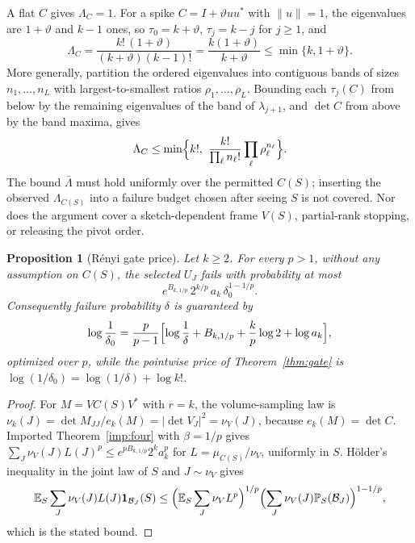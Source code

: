 \documentclass[11pt]{article}
\newtheorem{proposition}[theorem]{Proposition}
\theoremstyle{definition}\newtheorem{definition}[theorem]{Definition}
\theoremstyle{remark}\newtheorem{remark}[theorem]{Remark}
\newcommand{\E}{\mathbb E}
\newcommand{\Prob}{\mathbb P}
\newcommand{\1}{\mathbf 1}
\begin{document}
A flat $C$ gives $\Lambda_C=1$. For a spike $C=I+\vartheta uu^*$ with
$\|u\|=1$, the eigenvalues are $1+\vartheta$ and $k-1$ ones, so
$\tau_0=k+\vartheta$, $\tau_j=k-j$ for $j\ge1$, and
\[
 \Lambda_C=\frac{k!\,(1+\vartheta)}{(k+\vartheta)(k-1)!}
 =\frac{k(1+\vartheta)}{k+\vartheta}\le\min\{k,1+\vartheta\}.
\]
More generally, partition the ordered eigenvalues into contiguous bands
of sizes $n_1,\dots,n_L$ with largest-to-smallest ratios
$\rho_1,\dots,\rho_L$. Bounding each $\tau_j(C)$ from below by the
remaining eigenvalues of the band of $\lambda_{j+1}$, and $\det C$ from
above by the band maxima, gives
\begin{equation}\label{eq:bands}
 \Lambda_C\le\min\Bigl\{k!,\ \frac{k!}{\prod_\ell n_\ell!}\prod_\ell\rho_\ell^{n_\ell}\Bigr\}.
\end{equation}
The bound $\bar\Lambda$ must hold uniformly over the permitted $C(S)$;
inserting the observed $\Lambda_{C(S)}$ into a failure budget chosen after
seeing $S$ is not covered. Nor does the argument cover a
sketch-dependent frame $V(S)$, partial-rank stopping, or releasing the
pivot order.

\begin{proposition}[R\'enyi gate price]\label{prop:renyi-gate}
Let $k\ge2$. For every $p>1$, without any assumption on $C(S)$, the
selected $U_J$ fails with probability at most
\[
 e^{B_{k,1/p}}\,2^{k/p}\,a_k\,\delta_0^{1-1/p}.
\]
Consequently failure probability $\delta$ is guaranteed by
\begin{equation}\label{eq:renyi-delta0}
 \log\frac1{\delta_0}=\frac p{p-1}\Bigl[\log\frac1\delta+B_{k,1/p}
 +\frac kp\log2+\log a_k\Bigr],
\end{equation}
optimized over $p$, while the pointwise price of
Theorem~\ref{thm:gate} is $\log(1/\delta_0)=\log(1/\delta)+\log k!$.
\end{proposition}
\begin{proof}
For $M=VC(S)V^*$ with $r=k$, the volume-sampling law is
$\nu_k(J)=\det M_{JJ}/e_k(M)=|\det V_J|^2=\nu_V(J)$, because
$e_k(M)=\det C$. Imported Theorem~\ref{imp:four} with $\beta=1/p$ gives
$\sum_J\nu_V(J)L(J)^p\le e^{pB_{k,1/p}}2^ka_k^p$ for $L=\mu_{C(S)}/\nu_V$,
uniformly in $S$. H\"older's inequality in the joint law of $S$ and
$J\sim\nu_V$ gives
\[
 \E_S\sum_J\nu_V(J)L(J)\1_{\mathcal B_J}(S)
 \le\Bigl(\E_S\sum_J\nu_VL^p\Bigr)^{1/p}
 \Bigl(\sum_J\nu_V(J)\Prob_S(\mathcal B_J)\Bigr)^{1-1/p},
\]
which is the stated bound.
\end{proof}
\end{document}
